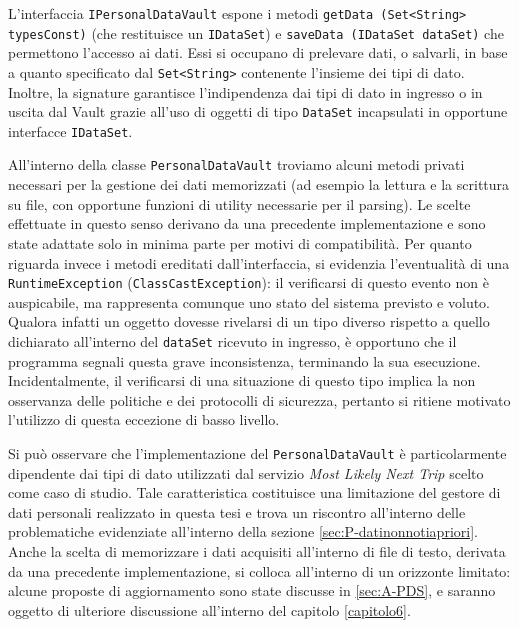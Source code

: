 L’interfaccia \texttt{IPersonalDataVault} espone i metodi \texttt{getData (Set<String> typesConst)} (che restituisce un \texttt{IDataSet}) e \texttt{saveData (IDataSet dataSet)} che permettono l’accesso ai dati. Essi si occupano di prelevare dati, o salvarli, in base a quanto specificato dal \texttt{Set<String>} contenente l’insieme dei tipi di dato. Inoltre, la signature garantisce l’indipendenza dai tipi di dato in ingresso o in uscita dal Vault grazie all’uso di oggetti di tipo \texttt{DataSet} incapsulati in opportune interfacce \texttt{IDataSet}. 

All’interno della classe \texttt{PersonalDataVault} troviamo alcuni metodi privati necessari per la gestione dei dati memorizzati (ad esempio la lettura e la scrittura su file, con opportune funzioni di utility necessarie per il parsing). Le scelte effettuate in questo senso derivano da una precedente implementazione e sono state adattate solo in minima parte per motivi di compatibilit\`a. Per quanto riguarda invece i metodi ereditati dall’interfaccia, si evidenzia l’eventualit\`a di una \texttt{RuntimeException} (\texttt{ClassCastException}): il verificarsi di questo evento non \`e auspicabile, ma rappresenta comunque uno stato del sistema previsto e voluto. Qualora infatti un oggetto dovesse rivelarsi di un tipo diverso rispetto a quello dichiarato all’interno del \texttt{dataSet} ricevuto in ingresso, \`e opportuno che il programma segnali questa grave inconsistenza, terminando la sua esecuzione. Incidentalmente, il verificarsi di una situazione di questo tipo implica la non osservanza delle politiche e dei protocolli di sicurezza, pertanto si ritiene motivato l’utilizzo di questa eccezione di basso livello.

Si può osservare che l’implementazione del \texttt{PersonalDataVault} è particolarmente dipendente dai tipi di dato utilizzati dal servizio \textit{Most Likely Next Trip} scelto come caso di studio. Tale caratteristica costituisce una limitazione del gestore di dati personali realizzato in questa tesi e trova un riscontro all’interno delle problematiche evidenziate all’interno della sezione \ref{sec:P-datinonnotiapriori}. Anche la scelta di memorizzare i dati acquisiti all’interno di file di testo, derivata da una precedente implementazione, si colloca all’interno di un orizzonte limitato: alcune proposte di aggiornamento sono state discusse in \ref{sec:A-PDS}, e saranno oggetto di ulteriore discussione all’interno del capitolo \ref{capitolo6}.

